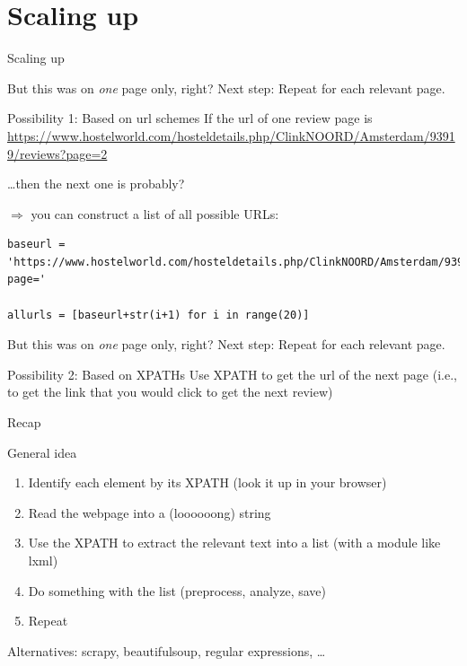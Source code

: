 \documentclass{beamer}
\begin{document}
\section{Scaling up}
\begin{frame}[plain]
	Scaling up
\end{frame}


\begin{frame}[fragile]{But this was on \emph{one} page only, right?}
Next step: Repeat for each relevant page.

\begin{block}{Possibility 1: Based on url schemes}
	If the url of one review page is \url{https://www.hostelworld.com/hosteldetails.php/ClinkNOORD/Amsterdam/93919/reviews?page=2}

\ldots then the next one is probably?
\end{block}

\pause

$\Rightarrow$ you can construct a list of all possible URLs:

\begin{lstlisting}
baseurl = 'https://www.hostelworld.com/hosteldetails.php/ClinkNOORD/Amsterdam/93919/reviews?page='

allurls = [baseurl+str(i+1) for i in range(20)]
\end{lstlisting}	
	
\end{frame}




\begin{frame}[fragile]{But this was on \emph{one} page only, right?}
	Next step: Repeat for each relevant page.
	
	\begin{block}{Possibility 2: Based on XPATHs}
	Use XPATH to get the url of the next page (i.e., to get the link that you would click to get the next review)
	\end{block}
	
\end{frame}



\begin{frame}{Recap}
\begin{block}{General idea}
\begin{enumerate}
\item Identify each element by its XPATH (look it up in your browser) 
\item Read the webpage into a (loooooong) string
\item Use the XPATH to extract the relevant text into a list (with a module like lxml)
\item Do something with the list (preprocess, analyze, save)
\item Repeat
\end{enumerate}
\footnotesize{Alternatives: scrapy, beautifulsoup, regular expressions, \ldots}
\end{block}
\end{frame}
\end{document}

